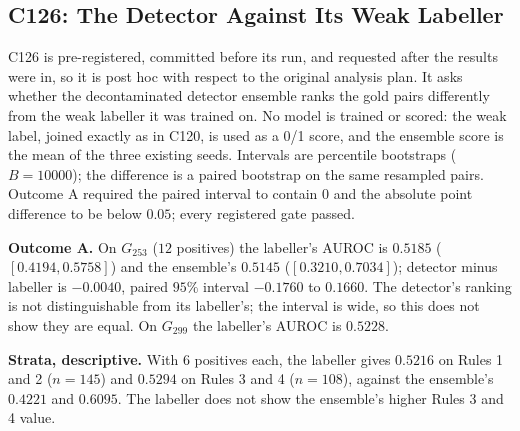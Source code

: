 \subsection{C126: The Detector Against Its Weak Labeller}
\label{sup:sec:s5-c126}

C126 is pre-registered, committed before its run, and requested after the results were in, so it
is post hoc with respect to the original analysis plan. It asks whether the decontaminated detector
ensemble ranks the gold pairs differently from the weak labeller it was trained on. No model is
trained or scored: the weak label, joined exactly as in C120, is used as a 0/1 score, and the
ensemble score is the mean of the three existing seeds. Intervals are percentile bootstraps
($B = 10000$); the difference is a paired bootstrap on the same resampled pairs. Outcome A required
the paired interval to contain 0 and the absolute point difference to be below $0.05$; every
registered gate passed.

\textbf{Outcome A.} On $G_{253}$ ($12$ positives) the labeller's AUROC is $0.5185$
($[0.4194, 0.5758]$) and the ensemble's $0.5145$ ($[0.3210, 0.7034]$); detector minus labeller is
$-0.0040$, paired $95\%$ interval $-0.1760$ to $0.1660$. The detector's ranking is not
distinguishable from its labeller's; the interval is wide, so this does not show they are equal.
On $G_{299}$ the labeller's AUROC is $0.5228$.

\textbf{Strata, descriptive.} With $6$ positives each, the labeller gives $0.5216$ on Rules 1 and 2
($n = 145$) and $0.5294$ on Rules 3 and 4 ($n = 108$), against the ensemble's $0.4221$ and $0.6095$.
The labeller does not show the ensemble's higher Rules 3 and 4 value.

